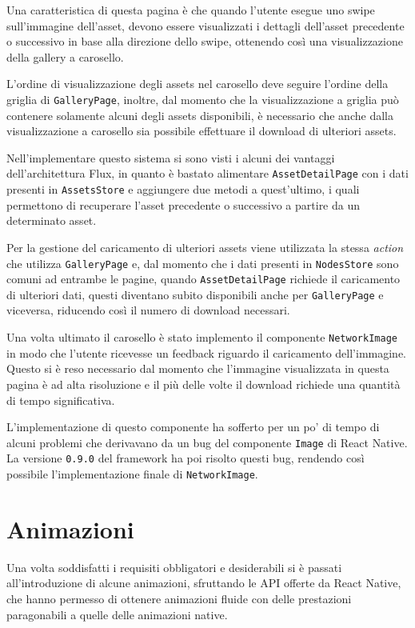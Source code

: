 Una caratteristica di questa pagina è che quando l'utente esegue uno swipe sull'immagine dell'asset, devono essere visualizzati i dettagli dell'asset precedente o successivo in base alla direzione dello swipe, ottenendo così una visualizzazione della gallery a carosello.

L'ordine di visualizzazione degli assets nel carosello deve seguire l'ordine della griglia di \texttt{GalleryPage}, inoltre, dal momento che la visualizzazione a griglia può contenere solamente alcuni degli assets disponibili, è necessario che anche dalla visualizzazione a carosello sia possibile effettuare il download di ulteriori assets.

Nell'implementare questo sistema si sono visti i alcuni dei vantaggi dell'architettura Flux, in quanto è bastato alimentare \texttt{AssetDetailPage} con i dati presenti in \texttt{AssetsStore} e aggiungere due metodi a quest'ultimo, i quali permettono di recuperare l'asset precedente o successivo a partire da un determinato asset.

Per la gestione del caricamento di ulteriori assets viene utilizzata la stessa \textit{action} che utilizza \texttt{GalleryPage} e, dal momento che i dati presenti in \texttt{NodesStore} sono comuni ad entrambe le pagine, quando \texttt{AssetDetailPage} richiede il caricamento di ulteriori dati, questi diventano subito disponibili anche per \texttt{GalleryPage} e viceversa, riducendo così il numero di download necessari.

Una volta ultimato il carosello è stato implemento il componente \texttt{NetworkImage} in modo che l'utente ricevesse un feedback riguardo il caricamento dell'immagine.
Questo si è reso necessario dal momento che l'immagine visualizzata in questa pagina è ad alta risoluzione e il più delle volte il download richiede una quantità di tempo significativa.

L'implementazione di questo componente ha sofferto per un po' di tempo di alcuni problemi che derivavano da un bug del componente \texttt{Image} di React Native.
La versione \texttt{0.9.0} del framework ha poi risolto questi bug, rendendo così possibile l'implementazione finale di \texttt{NetworkImage}.


\section{Animazioni}

Una volta soddisfatti i requisiti obbligatori e desiderabili si è passati all'introduzione di alcune animazioni, sfruttando le API offerte da React Native, che hanno permesso di ottenere animazioni fluide con delle prestazioni paragonabili a quelle delle animazioni native.

